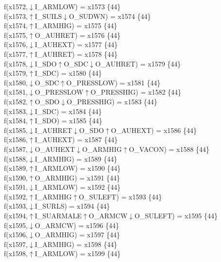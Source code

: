 f(x1572,$\downarrow$I\_ARMLOW) = x1573 \{44\} \\  
f(x1573,$\uparrow$I\_SUILS$\downarrow$O\_SUDWN) = x1574 \{44\} \\  
f(x1574,$\uparrow$I\_ARMHIG) = x1575 \{44\} \\  
f(x1575,$\uparrow$O\_AUHRET) = x1576 \{44\} \\  
f(x1576,$\downarrow$I\_AUHEXT) = x1577 \{44\} \\  
f(x1577,$\uparrow$I\_AUHRET) = x1578 \{44\} \\  
f(x1578,$\downarrow$I\_SDO$\uparrow$O\_SDC$\downarrow$O\_AUHRET) = x1579 \{44\} \\  
f(x1579,$\uparrow$I\_SDC) = x1580 \{44\} \\  
f(x1580,$\downarrow$O\_SDC$\uparrow$O\_PRESSLOW) = x1581 \{44\} \\  
f(x1581,$\downarrow$O\_PRESSLOW$\uparrow$O\_PRESSHIG) = x1582 \{44\} \\  
f(x1582,$\uparrow$O\_SDO$\downarrow$O\_PRESSHIG) = x1583 \{44\} \\  
f(x1583,$\downarrow$I\_SDC) = x1584 \{44\} \\  
f(x1584,$\uparrow$I\_SDO) = x1585 \{44\} \\  
f(x1585,$\downarrow$I\_AUHRET$\downarrow$O\_SDO$\uparrow$O\_AUHEXT) = x1586 \{44\} \\  
f(x1586,$\uparrow$I\_AUHEXT) = x1587 \{44\} \\  
f(x1587,$\downarrow$O\_AUHEXT$\downarrow$O\_ARMHIG$\uparrow$O\_VACON) = x1588 \{44\} \\  
f(x1588,$\downarrow$I\_ARMHIG) = x1589 \{44\} \\  
f(x1589,$\uparrow$I\_ARMLOW) = x1590 \{44\} \\  
f(x1590,$\uparrow$O\_ARMHIG) = x1591 \{44\} \\  
f(x1591,$\downarrow$I\_ARMLOW) = x1592 \{44\} \\  
f(x1592,$\uparrow$I\_ARMHIG$\uparrow$O\_SULEFT) = x1593 \{44\} \\  
f(x1593,$\downarrow$I\_SURLS) = x1594 \{44\} \\  
f(x1594,$\uparrow$I\_SUARMALE$\uparrow$O\_ARMCW$\downarrow$O\_SULEFT) = x1595 \{44\} \\  
f(x1595,$\downarrow$O\_ARMCW) = x1596 \{44\} \\  
f(x1596,$\downarrow$O\_ARMHIG) = x1597 \{44\} \\  
f(x1597,$\downarrow$I\_ARMHIG) = x1598 \{44\} \\  
f(x1598,$\uparrow$I\_ARMLOW) = x1599 \{44\} \\  
